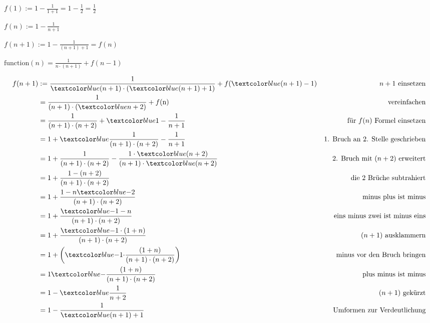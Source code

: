 \documentclass{lehramt-informatik-aufgabe}
\begin{document}
\begin{liAntwort}
\liInduktionAnfang

$f(1) := 1 - \frac{1}{1 + 1} = 1 - \frac{1}{2} = \frac{1}{2}$

\liInduktionVoraussetzung

$f(n) := 1 - \frac{1}{n + 1}$

\liInduktionSchritt


$f(n + 1) := 1 - \frac{1}{(n + 1) + 1} = f(n)$


$\text{function}(n) = \frac{1}{n \cdot (n + 1)} + f(n - 1)$

\begin{align*}
f(n + 1) & := \frac{1}{\m{(n + 1)} \cdot (\m{(n + 1) }+ 1)} + f(\m{(n + 1)} - 1)& n + 1 \text{ einsetzen}\\
& = \frac{1}{(n + 1) \cdot (\m{n + 2})} + f(\text{n})
&  \text{ vereinfachen}\\
%
& = \frac{1}{(n + 1) \cdot (n + 2)} + \m{1 - \frac{1}{n + 1}}
& \text{für } f(n) \text{ Formel einsetzen}\\
%
& = 1 + \m{\frac{1}{(n + 1) \cdot (n + 2)}} - \frac{1}{n + 1}
& \text{1. Bruch an 2. Stelle geschrieben}\\
%
& = 1 + \frac{1}{(n + 1) \cdot (n + 2)} - \frac{1 \cdot \m{(n + 2)}}{(n + 1) \cdot \m{(n + 2)}}
& \text{2. Bruch mit }(n + 2) \text{ erweitert}\\
%
& = 1 + \frac{1 - (n + 2)}{(n + 1) \cdot (n + 2)}
& \text{die 2 Brüche subtrahiert}\\
%
& = 1 + \frac{1 - n \m{-} 2}{(n + 1) \cdot (n + 2)}
& \text{minus plus ist minus}\\
%
& = 1 + \frac{\m{-1} - n}{(n + 1) \cdot (n + 2)}
& \text{eins minus zwei ist minus eins}\\
%
& = 1 + \frac{\m{-1 \cdot (1 + n)}}{(n + 1) \cdot (n + 2)}
& (n + 1) \text{ ausklammern}\\
%
& = 1 + \left(\m{-1 \cdot} \frac{(1 + n)}{(n + 1) \cdot (n + 2)}\right)
& \text{minus vor den Bruch bringen}\\
%
& = 1 \m{-} \frac{(1 + n)}{(n + 1) \cdot (n + 2)}
& \text{plus minus ist minus}\\
%
& = 1 - \m{\frac{1}{n + 2}}
& (n + 1) \text{ gekürzt}\\
%
& = 1 - \frac{1}{\m{(n + 1)} + 1}
& \text{Umformen zur Verdeutlichung}\\
\end{align*}
\end{liAntwort}
\end{document}
